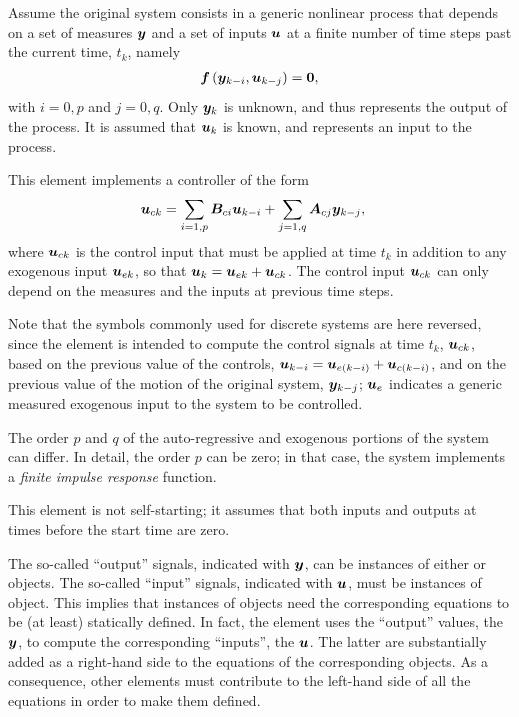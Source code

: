Assume the original system consists in a generic nonlinear process
that depends on a set of measures $\boldsymbol{y}$ and a set of inputs $\boldsymbol{u}$
at a finite number of time steps past the current time, $t_k$, namely
\begin{align}
	\boldsymbol{f}\left( \boldsymbol{y}_{k - i}, \boldsymbol{u}_{k - j} \right) = \boldsymbol{0} ,
\end{align}
with $i=0,p$ and $j=0,q$.
Only $\boldsymbol{y}_k$ is unknown, and thus represents the output of the process.
It is assumed that $\boldsymbol{u}_k$ is known, and represents an input
to the process.

This element implements a controller of the form
\begin{align}
	\boldsymbol{u}_{ck}
	&= \sum_{i=1,p} \boldsymbol{B}_{ci} \boldsymbol{u}_{k - i}
	+ \sum_{j=1,q} \boldsymbol{A}_{cj} \boldsymbol{y}_{k - j} ,
\end{align}
where $\boldsymbol{u}_{ck}$ is the control input that must be applied
at time $t_k$ in addition to any exogenous input $\boldsymbol{u}_{ek}$,
so that $\boldsymbol{u}_k = \boldsymbol{u}_{ek} + \boldsymbol{u}_{ck}$.
The control input $\boldsymbol{u}_{ck}$ can only depend on the measures
and the inputs at previous time steps.

Note that the symbols commonly used for discrete systems
are here reversed, since the element is intended to compute
the control signals at time $t_k$, $\boldsymbol{u}_{ck}$,
based on the previous value of the controls,
$\boldsymbol{u}_{k-i} = \boldsymbol{u}_{e(k - i)} + \boldsymbol{u}_{c(k - i)}$,
and on the previous value of the motion of the original system,
$\boldsymbol{y}_{k-j}$;
$\boldsymbol{u}_e$ indicates a generic measured exogenous input
to the system to be controlled.

The order $p$ and $q$ of the auto-regressive and exogenous portions
of the system can differ.
In detail, the order $p$ can be zero; in that case, the system
implements a \emph{finite impulse response} function.

This element is not self-starting; it assumes that both
inputs and outputs at times before the start time are zero.

The so-called ``output'' signals, indicated with $\boldsymbol{y}$,
can be instances of either  or  objects.
The so-called ``input'' signals, indicated with $\boldsymbol{u}$,
must be instances of  object.
This implies that instances of  objects
need the corresponding equations to be (at least) statically defined.
In fact, the  element uses the ``output''
 values, the $\boldsymbol{y}$, to compute the corresponding
``inputs'', the $\boldsymbol{u}$.
The latter are substantially added as a right-hand side
to the equations of the corresponding  objects.
As a consequence, other elements must contribute to the left-hand side
of all the  equations in order to make them defined.

